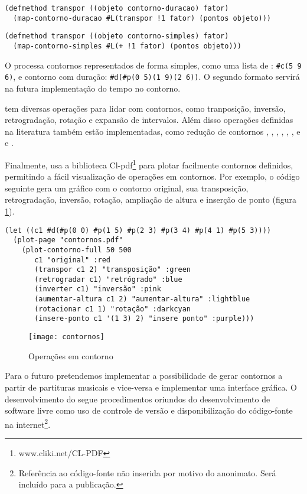 \begin{verbatim}
(defmethod transpor ((objeto contorno-duracao) fator)
  (map-contorno-duracao #L(transpor !1 fator) (pontos objeto)))
\end{verbatim}

\begin{verbatim}
(defmethod transpor ((objeto contorno-simples) fator)
  (map-contorno-simples #L(+ !1 fator) (pontos objeto)))
\end{verbatim}

O \goiaba{} processa contornos representados de forma simples, como
uma lista de : \verb!#c(5 9 6)!, e contorno com
duração: \verb!#d(#p(0 5)(1 9)(2 6))!. O segundo formato servirá na
futura implementação do tempo no contorno.

\goiaba{} tem diversas operações para lidar com contornos, como
tranposição, inversão, retrogradação, rotação e expansão de
intervalos. Além disso operações definidas na literatura também estão
implementadas, como redução de contornos \cite{adams76:melodic},
, , , , ,
 e  \cite{friedmann85:methodology} e
 \cite{morris93:directions}.

Finalmente, \goiaba{} usa a biblioteca
Cl-pdf\footnote{www.cliki.net/CL-PDF} para plotar facilmente contornos
definidos, permitindo a fácil visualização de operações em contornos.
Por exemplo, o código seguinte gera um gráfico com o contorno
original, sua transposição, retrogradação, inversão, rotação,
ampliação de altura e inserção de ponto (figura \ref{fig:operacoes}).

\begin{verbatim}
(let ((c1 #d(#p(0 0) #p(1 5) #p(2 3) #p(3 4) #p(4 1) #p(5 3))))
  (plot-page "contornos.pdf"
    (plot-contorno-full 50 500
       c1 "original" :red
       (transpor c1 2) "transposição" :green
       (retrogradar c1) "retrógrado" :blue
       (inverter c1) "inversão" :pink
       (aumentar-altura c1 2) "aumentar-altura" :lightblue
       (rotacionar c1 1) "rotação" :darkcyan
       (insere-ponto c1 '(1 3) 2) "insere ponto" :purple)))
\end{verbatim}

\begin{figure}
  \centering
  \texttt{[image: contornos]}
  \caption{Operações em contorno}
  \label{fig:operacoes}
\end{figure}
Para o futuro pretendemos implementar a possibilidade de gerar
contornos a partir de partituras musicais e vice-versa e implementar
uma interface gráfica. O desenvolvimento do \goiaba{} segue
procedimentos oriundos do desenvolvimento de software livre como uso
de controle de versão e disponibilização do código-fonte na
internet\footnote{Referência ao código-fonte não inserida por motivo
  do anonimato. Será incluído para a publicação.}.

